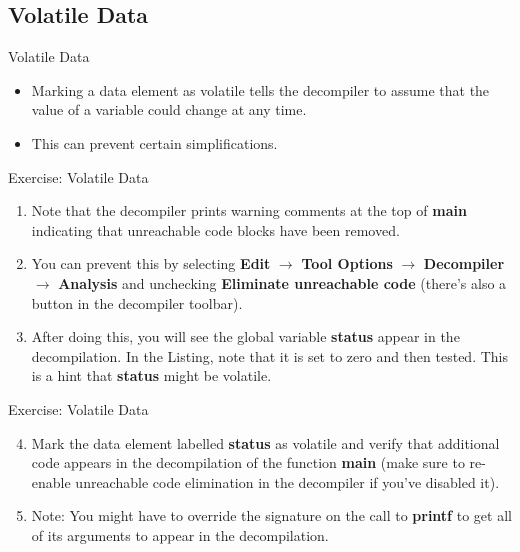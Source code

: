 \documentclass{beamer}
\begin{document}
\subsection{Volatile Data}
\begin{frame}
\begin{block}{Volatile Data}
\begin{itemize}
\item Marking a data element as volatile tells the decompiler to assume that the value of a variable could change at any time.
\item This can prevent certain simplifications.
\end{itemize}
\end{block}
\end{frame}

\begin{frame}
\begin{block}{Exercise: Volatile Data}
\begin{enumerate}
\item Note that the decompiler prints warning comments at the top of \textbf{main} indicating that unreachable code blocks have been removed.
\item You can prevent this by selecting \textbf{Edit} $\rightarrow$ \textbf{Tool Options} $\rightarrow$ \textbf{Decompiler} $\rightarrow$ \textbf{Analysis} and unchecking
\textbf {Eliminate unreachable code} (there's also a button in the decompiler toolbar).
\item After doing this, you will see the global variable \textbf{status} appear in the decompilation.  In the Listing, note that it is set to zero and then tested.  This is a hint that
\textbf{status} might be volatile.
\end{enumerate}
\end{block}
\end{frame}

\begin{frame}
\begin{block}{Exercise: Volatile Data}
\begin{enumerate}
\setcounter{enumi}{3}
\item Mark the data element labelled \textbf{status} as volatile and verify that additional code appears in the decompilation 
of the function \textbf{main} (make sure to re-enable unreachable code elimination in the decompiler if you've disabled it). 
\item Note: You might have to override the signature on the call to \textbf{printf} to get all of its arguments to appear in the decompilation.
\end{enumerate}
\end{block}
\end{frame}
\end{document}
